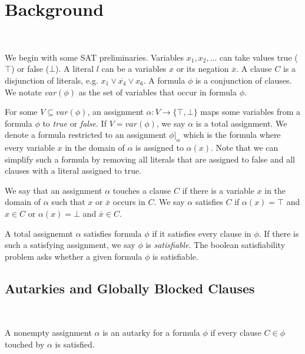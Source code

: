 \section{Background}~\label{sec:background}

We begin with some SAT preliminaries. Variables $x_1, x_2, ...$ can take values true ($\top$) or false ($\bot$). A literal $l$ can be a variables $x$ or its negation $\overline{x}$. A clause $C$ is a disjunction of literals, e.g. $x_1 \lor \overline{x_4} \lor x_6$. A formula $\phi$ is a conjunction of clauses. We notate $var(\phi)$ as the set of variables that occur in formula $\phi$.

For some $V \subseteq var(\phi)$, an assignment $\alpha : V \rightarrow \{\top, \bot\}$  maps some variables from a formula $\phi$ to \emph{true} or \emph{false}. If $V = var(\phi)$, we say $\alpha$ is a total assignment. We denote a formula restricted to an assignment $\phi|_\alpha$ which is the formula where every variable $x$ in the domain of $\alpha$ is assigned to $\alpha(x)$. Note that we can simplify such a formula by removing all literals that are assigned to false and all clauses with a literal assigned to true.

We say that an assignment $\alpha$ touches a clause $C$ if there is a variable $x$ in the domain of $\alpha$ such that $x$ or $\overline{x}$ occurs in $C$. We say $\alpha$ satisfies $C$ if $\alpha(x) = \top$ and $x \in C$ or $\alpha(x) = \bot$ and $\overline{x} \in C$.

A total assignemnt $\alpha$ satisfies formula $\phi$ if it satisfies every clause in $\phi$. If there is such a satisfying assignment, we say $\phi$ is \emph{satisfiable}. The boolean satisfiability problem asks whether a given formula $\phi$ is satisfiable.

\subsection{Autarkies and Globally Blocked Clauses}~\label{subsec:autarkies}

\begin{definition}[Autarky]
    A nonempty assignment $\alpha$ is an autarky for a formula $\phi$ if every clause $C \in \phi$ touched by $\alpha$ is satisfied.
\end{definition}


